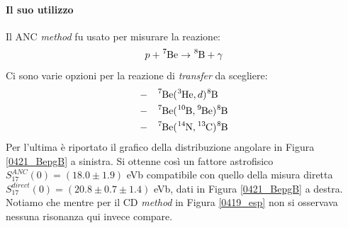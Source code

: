 \paragraph{Il suo utilizzo} Il ANC \textit{method} fu usato per misurare la reazione:
$$p+\ce{^7Be}\to \ce{^8B}+\gamma$$
Ci sono varie opzioni per la reazione di \textit{transfer} da scegliere:
\begin{align*}
	-&\quad \ce{^7Be}(\ce{^3He},d)\ce{^8B} \\
	-&\quad \ce{^7Be}(\ce{^{10}B},\ce{^9Be})\ce{^8B} \\
	-&\quad \ce{^7Be}(\ce{^{14}N},\ce{^{13}C})\ce{^8B} 
\end{align*}
Per l'ultima è riportato il grafico della distribuzione angolare in Figura \ref{0421_BepgB} a sinistra. Si ottenne così un fattore astrofisico $S_{17}^{ANC}(0) = (18.0\pm 1.9)$ eVb compatibile con quello della misura diretta $S_{17}^{direct}(0) = (20.8\pm 0.7\pm 1.4)$ eVb, dati in Figura \ref{0421_BepgB} a destra. Notiamo che mentre per il CD \textit{method} in Figura \ref{0419_esp} non si osservava nessuna risonanza qui invece compare.


